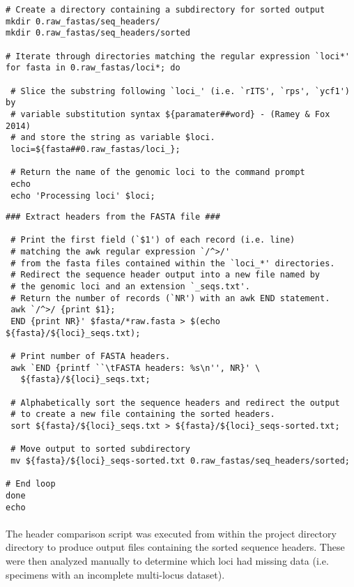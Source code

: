 \vspace*{30pt}

\begin{lstlisting}[caption={Contents of the \textit{header\_comp.sh} script}]
# Create a directory containing a subdirectory for sorted output
mkdir 0.raw_fastas/seq_headers/
mkdir 0.raw_fastas/seq_headers/sorted

# Iterate through directories matching the regular expression `loci*'
for fasta in 0.raw_fastas/loci*; do

 # Slice the substring following `loci_' (i.e. `rITS', `rps', `ycf1') by
 # variable substitution syntax ${paramater##word} - (Ramey & Fox 2014)
 # and store the string as variable $loci.
 loci=${fasta##0.raw_fastas/loci_};

 # Return the name of the genomic loci to the command prompt
 echo
 echo 'Processing loci' $loci;
\end{lstlisting}

\clearpage

\setcounter{lstlisting}{5}
\begin{lstlisting}[caption={Continued}]
 ### Extract headers from the FASTA file ###

 # Print the first field (`$1') of each record (i.e. line)
 # matching the awk regular expression `/^>/'
 # from the fasta files contained within the `loci_*' directories.
 # Redirect the sequence header output into a new file named by
 # the genomic loci and an extension `_seqs.txt'.
 # Return the number of records (`NR') with an awk END statement.
 awk `/^>/ {print $1};
 END {print NR}' $fasta/*raw.fasta > $(echo ${fasta}/${loci}_seqs.txt);

 # Print number of FASTA headers.
 awk `END {printf ``\tFASTA headers: %s\n'', NR}' \
   ${fasta}/${loci}_seqs.txt;
 
 # Alphabetically sort the sequence headers and redirect the output
 # to create a new file containing the sorted headers.
 sort ${fasta}/${loci}_seqs.txt > ${fasta}/${loci}_seqs-sorted.txt;

 # Move output to sorted subdirectory
 mv ${fasta}/${loci}_seqs-sorted.txt 0.raw_fastas/seq_headers/sorted;

# End loop
done
echo
\end{lstlisting}

\clearpage

\paragraph{} The header comparison script was executed from within the project directory directory to produce output files containing the sorted sequence headers.  These were then analyzed manually to determine which loci had missing data (i.e. specimens with an incomplete multi-locus dataset).   

